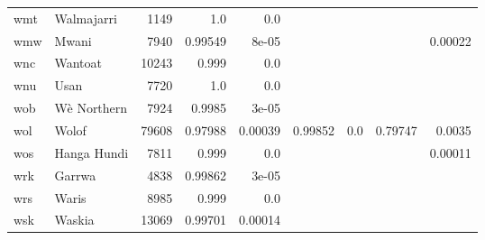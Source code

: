 \documentclass[11pt]{article}
\begin{document}
\begin{table*}[h]
{\begin{tabular}{llrrrrrrr}
wmt         & Walmajarri         & 1149         & 1.0         & 0.0         &          &          &          &          \\

wmw         & Mwani         & 7940         & 0.99549         & 8e-05         &          &          &          & 0.00022         \\

wnc         & Wantoat         & 10243         & 0.999         & 0.0         &          &          &          &          \\

wnu         & Usan         & 7720         & 1.0         & 0.0         &          &          &          &          \\

wob         & Wè Northern         & 7924         & 0.9985         & 3e-05         &          &          &          &          \\

wol         & Wolof         & 79608         & 0.97988         & 0.00039         & 0.99852         & 0.0         & 0.79747         & 0.0035         \\

wos         & Hanga Hundi         & 7811         & 0.999         & 0.0         &          &          &          & 0.00011         \\

wrk         & Garrwa         & 4838         & 0.99862         & 3e-05         &          &          &          &          \\

wrs         & Waris         & 8985         & 0.999         & 0.0         &          &          &          &          \\

wsk         & Waskia         & 13069         & 0.99701         & 0.00014         &          &          &          &          \\


\end{tabular}}
\end{table*}
\end{document}
